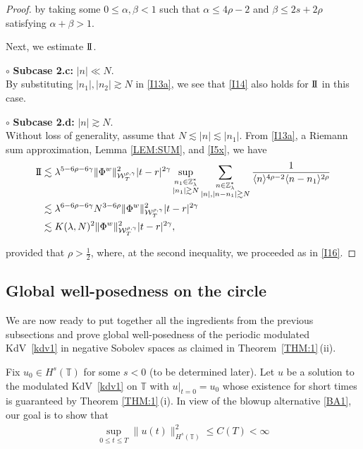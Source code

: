 \documentclass[letterpaper, 11pt,  reqno]{amsart}
\newcommand{\1}{\hspace{0.5mm}\text{I}\hspace{0.5mm}}
\newcommand{\II}{\text{I \hspace{-2.8mm} I} }
\newcommand{\noi}{\noindent}
\newcommand{\Z}{\mathbb{Z}}
\newcommand{\T}{\mathbb{T}}
\newcommand{\al}{\alpha}
\newcommand{\be}{\beta}
\newcommand{\g}{\gamma}
\newcommand{\ld}{\lambda}
\newcommand{\les}{\lesssim}
\newcommand{\ges}{\gtrsim}
\newcommand{\jb}[1]
{\langle #1 \rangle}
\newcommand{\W}{\mathcal{W}}
\numberwithin{equation}{section}
\numberwithin{theorem}{section}
\begin{document}
\begin{proof}
\noi
by taking some $0 \le \al, \be < 1$
such that $\al \le 4\rho - 2$
and $ \be \le 2s + 2\rho$
satisfying $\al + \be > 1$.




\medskip

Next, we  estimate $\II$.


\noi
$\circ$ {\bf Subcase 2.c:}  $|n| \ll N$.\\
\indent
By substituting  $|n_1|, |n_2|\ges N$ in \eqref{I13a}, 
we see that \eqref{I14} also holds for $\II$ in this case.





\medskip

\noi
$\circ$ {\bf Subcase 2.d:}  $|n| \ges N$.\\
\indent
Without loss of generality, assume that $N \les |n| \les |n_1|$.
From \eqref{I13a}, 
 a Riemann sum approximation, 
Lemma \ref{LEM:SUM}, 
and 
\eqref{I5x}, 
we have
\begin{align*}
\II
&\les 
\ld^{5-6\rho -6\g}
\| \Phi^{w} \|^2_{\W_{T}^{\rho, \g}} 
|t-r|^{2\g} 
\sup_{\substack{n_1 \in \Z_\ld^*\\|n_1|\ges N} }
\sum_{\substack{n \in \Z_\ld^*\\|n|, |n- n_1|\ges N}} 
\frac{1}{\jb{n}^{4\rho - 2}\jb{n - n_1}^{2\rho}}\\
 &\les 
\ld^{6-6\rho -6\g}N^{3-6\rho }
 \| \Phi^{w} \|^2_{\W_{T}^{\rho, \g}}  
|t-r|^{2\g}\\
 &\les 
K(\ld, N)^2
 \| \Phi^{w} \|^2_{\W_{T}^{\rho, \g}}  
|t-r|^{2\g}, 
\end{align*}

\noi
provided that $\rho > \frac 12$, 
where, at the second inequality, we proceeded as in \eqref{I16}.
\end{proof}







\subsection{Global well-posedness on the circle}
\label{SUBSEC:I4}


We are now ready to put  together all the ingredients from the previous subsections
and prove
global well-posedness  
of the periodic modulated KdV~\eqref{kdv1} in negative Sobolev spaces
as  claimed in Theorem~\ref{THM:1}\,(ii).

Fix $u_0 \in H^s(\T)$ for some $s < 0$ (to be determined later).
Let 
 $u$ be a solution to  the modulated KdV~\eqref{kdv1} on $\T$ 
with $u|_{t = 0} = u_0$
whose existence for short times is guaranteed by Theorem \ref{THM:1}\,(i).
In view of the blowup alternative \eqref{BA1}, 
our goal is to show that 
\begin{align}
\sup_{0 \le t \le T} \|u(t)\|_{H^s(\T)}^2 \le C(T) < \infty
\label{ME2}
\end{align}
\end{document}
